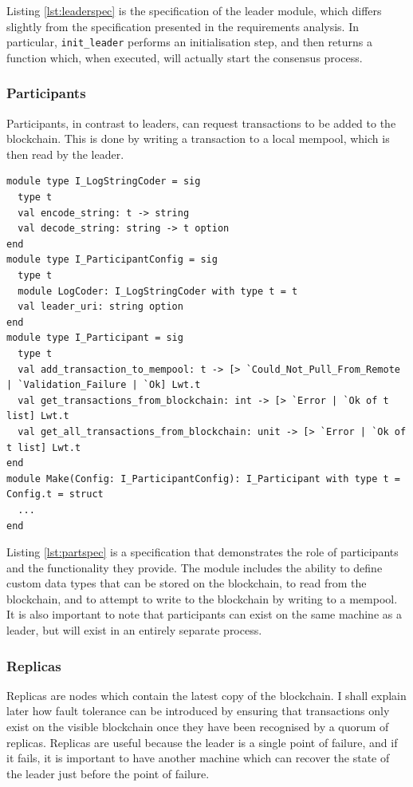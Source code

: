 \documentclass[12pt,a4paper,twoside,openright]{report}
\begin{document}
	Listing \ref{lst:leaderspec} is the specification of the leader module, which differs slightly from the specification presented in the requirements analysis.
	In particular, \texttt{init\_leader} performs an initialisation step, and then returns a function which, when executed, will actually start the consensus process.

	\subsubsection*{Participants}
	Participants, in contrast to leaders, can request transactions to be added to the blockchain. 
	This is done by writing a transaction to a local mempool, which is then read by the leader.\\

	\begin{lstlisting}[caption={Participant Specification},label={lst:partspec}]
module type I_LogStringCoder = sig
  type t
  val encode_string: t -> string
  val decode_string: string -> t option
end
module type I_ParticipantConfig = sig
  type t
  module LogCoder: I_LogStringCoder with type t = t
  val leader_uri: string option
end
module type I_Participant = sig
  type t
  val add_transaction_to_mempool: t -> [> `Could_Not_Pull_From_Remote | `Validation_Failure | `Ok] Lwt.t
  val get_transactions_from_blockchain: int -> [> `Error | `Ok of t list] Lwt.t
  val get_all_transactions_from_blockchain: unit -> [> `Error | `Ok of t list] Lwt.t
end
module Make(Config: I_ParticipantConfig): I_Participant with type t = Config.t = struct
  ...
end
	\end{lstlisting}

	Listing \ref{lst:partspec} is a specification that demonstrates the role of participants and the functionality they provide.
	The module includes the ability to define custom data types that can be stored on the blockchain, to read from the blockchain, and to attempt to write to the blockchain by writing to a mempool.
	It is also important to note that participants can exist on the same machine as a leader, but will exist in an entirely separate process.

	\subsubsection*{Replicas}
	Replicas are nodes which contain the latest copy of the blockchain. 
	I shall explain later how fault tolerance can be introduced by ensuring that transactions only exist on the visible blockchain once they have been recognised by a quorum of replicas.
	Replicas are useful because the leader is a single point of failure, and if it fails, it is important to have another machine which can recover the state of the leader just before the point of failure.
	
\end{document}
